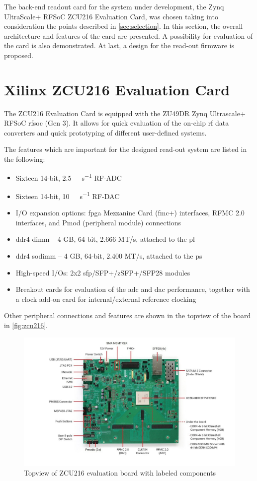 The back-end readout card for the system under development, the Zynq UltraScale+ RFSoC ZCU216 Evaluation Card, was chosen taking into consideration the points described in \autoref{sec:selection}.
In this section, the overall architecture and features of the card are presented.
A possibility for evaluation of the card is also demonstrated.
At last, a design for the read-out firmware is proposed. 

\section{Xilinx ZCU216 Evaluation Card}
The ZCU216 Evaluation Card is equipped with the ZU49DR Zynq Ultrascale+ RFSoC \gls{rfsoc} (Gen 3). 
It allows for quick evaluation of the on-chip \gls{rf} data converters and quick prototyping of different user-defined systems.

The features which are important for the designed read-out system are listed in the following:
\begin{itemize}[noitemsep]
	\item Sixteen 14-bit, \SI{2.5}{\giga \sample \per \second} RF-ADC
	\item Sixteen 14-bit, \SI{10}{\giga \sample \per \second} RF-DAC
	\item I/O expansion options: \gls{fpga} Mezzanine Card (\gls{fmc}+) interfaces, RFMC 2.0 interfaces, and Pmod (peripheral module) connections
	\item \gls{ddr}4 \gls{dimm} – 4 GB, 64-bit, 2.666 MT/s, attached to the \gls{pl}
	\item \gls{ddr}4 \gls{sodimm} – 4 GB, 64-bit, 2.400 MT/s, attached to the \gls{ps}
	\item High-speed I/Os: 2x2 \gls{sfp}/SFP+/zSFP+/SFP28 modules
	\item Breakout cards for evaluation of the \gls{adc} and \gls{dac} performance, together with a clock add-on card for internal/external reference clocking
\end{itemize}
Other peripheral connections and features are shown in the topview of the board in \autoref{fig:zcu216}.
\begin{figure}[tbh]
	\centering
	\includegraphics[width = \textwidth]{chap/04-work/img/zcu216}
	\caption{Topview of ZCU216 evaluation board with labeled components}
	\label{fig:zcu216}
\end{figure}

